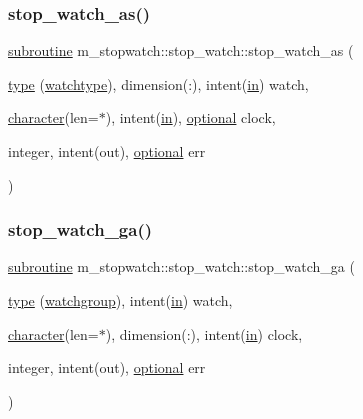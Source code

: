 \subsubsection{\texorpdfstring{stop\+\_\+watch\+\_\+as()}{stop\_watch\_as()}}
{\footnotesize\ttfamily \hyperlink{M__stopwatch_83_8txt_acfbcff50169d691ff02d4a123ed70482}{subroutine} m\+\_\+stopwatch\+::stop\+\_\+watch\+::stop\+\_\+watch\+\_\+as (\begin{DoxyParamCaption}\item[{\hyperlink{stop__watch_83_8txt_a70f0ead91c32e25323c03265aa302c1c}{type} (\hyperlink{structm__stopwatch_1_1watchtype}{watchtype}), dimension(\+:), intent(\hyperlink{M__journal_83_8txt_afce72651d1eed785a2132bee863b2f38}{in})}]{watch,  }\item[{\hyperlink{option__stopwatch_83_8txt_abd4b21fbbd175834027b5224bfe97e66}{character}(len=$\ast$), intent(\hyperlink{M__journal_83_8txt_afce72651d1eed785a2132bee863b2f38}{in}), \hyperlink{option__stopwatch_83_8txt_aa4ece75e7acf58a4843f70fe18c3ade5}{optional}}]{clock,  }\item[{integer, intent(out), \hyperlink{option__stopwatch_83_8txt_aa4ece75e7acf58a4843f70fe18c3ade5}{optional}}]{err }\end{DoxyParamCaption})\hspace{0.3cm}{\ttfamily [private]}}

\mbox{\label{interfacem__stopwatch_1_1stop__watch_a3b9a5aa22f56175c450b299f3ddc6ac1}} 
\subsubsection{\texorpdfstring{stop\+\_\+watch\+\_\+ga()}{stop\_watch\_ga()}}
{\footnotesize\ttfamily \hyperlink{M__stopwatch_83_8txt_acfbcff50169d691ff02d4a123ed70482}{subroutine} m\+\_\+stopwatch\+::stop\+\_\+watch\+::stop\+\_\+watch\+\_\+ga (\begin{DoxyParamCaption}\item[{\hyperlink{stop__watch_83_8txt_a70f0ead91c32e25323c03265aa302c1c}{type} (\hyperlink{structm__stopwatch_1_1watchgroup}{watchgroup}), intent(\hyperlink{M__journal_83_8txt_afce72651d1eed785a2132bee863b2f38}{in})}]{watch,  }\item[{\hyperlink{option__stopwatch_83_8txt_abd4b21fbbd175834027b5224bfe97e66}{character}(len=$\ast$), dimension(\+:), intent(\hyperlink{M__journal_83_8txt_afce72651d1eed785a2132bee863b2f38}{in})}]{clock,  }\item[{integer, intent(out), \hyperlink{option__stopwatch_83_8txt_aa4ece75e7acf58a4843f70fe18c3ade5}{optional}}]{err }\end{DoxyParamCaption})\hspace{0.3cm}{\ttfamily [private]}}

